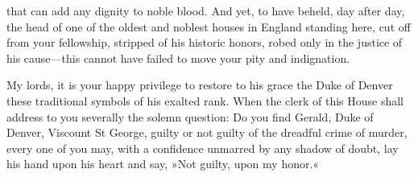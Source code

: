 \begin{dialogue}
that can add any dignity to noble blood. And yet, to have beheld, day after day, the head of one of the oldest and noblest houses in England standing here, cut off from your fellowship, stripped of his historic honors, robed only in the justice of his cause\allowbreak---\allowbreak this cannot have failed to move your pity and indignation.

\smallskip

My lords, it is your happy privilege to restore to his grace the Duke of Denver these traditional symbols of his exalted rank. When the clerk of this House shall address to you severally the solemn question: Do you find Gerald, Duke of Denver, Viscount St George, guilty or not guilty of the dreadful crime of murder, every one of you may, with a confidence unmarred by any shadow of doubt, lay his hand upon his heart and say, »Not guilty, upon my honor.«

\end{dialogue}
